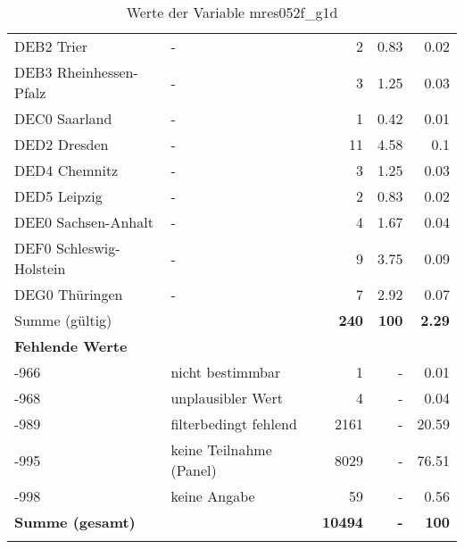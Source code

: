\begin{longtable}{Xlrrr}
        \multicolumn{1}{X}{DEB2 Trier} & - & \num{2} & \num[round-mode=places,round-precision=2]{0.83} & \num[round-mode=places,round-precision=2]{0.02} \\
        \multicolumn{1}{X}{DEB3 Rheinhessen-Pfalz} & - & \num{3} & \num[round-mode=places,round-precision=2]{1.25} & \num[round-mode=places,round-precision=2]{0.03} \\
        \multicolumn{1}{X}{DEC0 Saarland} & - & \num{1} & \num[round-mode=places,round-precision=2]{0.42} & \num[round-mode=places,round-precision=2]{0.01} \\
        \multicolumn{1}{X}{DED2 Dresden} & - & \num{11} & \num[round-mode=places,round-precision=2]{4.58} & \num[round-mode=places,round-precision=2]{0.1} \\
        \multicolumn{1}{X}{DED4 Chemnitz} & - & \num{3} & \num[round-mode=places,round-precision=2]{1.25} & \num[round-mode=places,round-precision=2]{0.03} \\
        \multicolumn{1}{X}{DED5 Leipzig} & - & \num{2} & \num[round-mode=places,round-precision=2]{0.83} & \num[round-mode=places,round-precision=2]{0.02} \\
        \multicolumn{1}{X}{DEE0 Sachsen-Anhalt} & - & \num{4} & \num[round-mode=places,round-precision=2]{1.67} & \num[round-mode=places,round-precision=2]{0.04} \\
        \multicolumn{1}{X}{DEF0 Schleswig-Holstein} & - & \num{9} & \num[round-mode=places,round-precision=2]{3.75} & \num[round-mode=places,round-precision=2]{0.09} \\
        \multicolumn{1}{X}{DEG0 Thüringen} & - & \num{7} & \num[round-mode=places,round-precision=2]{2.92} & \num[round-mode=places,round-precision=2]{0.07} \\
     \midrule
      \multicolumn{2}{l}{Summe (gültig)} & \textbf{\num{240}} &
      \textbf{\num{100}} &
         \textbf{\num[round-mode=places,round-precision=2]{2.29}} \\
     \multicolumn{5}{l}{\textbf{Fehlende Werte}}\\
       -966 & nicht bestimmbar & \num{1} & - & \num[round-mode=places,round-precision=2]{0.01} \\

       -968 & unplausibler Wert & \num{4} & - & \num[round-mode=places,round-precision=2]{0.04} \\

       -989 & filterbedingt fehlend & \num{2161} & - & \num[round-mode=places,round-precision=2]{20.59} \\

       -995 & keine Teilnahme (Panel) & \num{8029} & - & \num[round-mode=places,round-precision=2]{76.51} \\

       -998 & keine Angabe & \num{59} & - & \num[round-mode=places,round-precision=2]{0.56} \\

     \midrule
     \multicolumn{2}{l}{\textbf{Summe (gesamt)}} & \textbf{\num{10494}} & \textbf{-} & \textbf{\num{100}} \\
     \bottomrule
     \caption{Werte der Variable mres052f\_g1d}
     \end{longtable}
     
